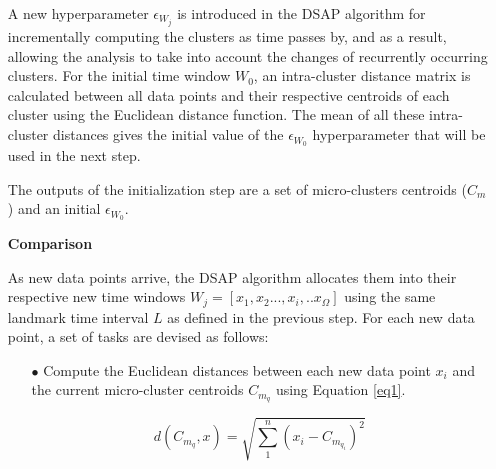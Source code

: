 \begin{itemize}[leftmargin=*]
A new hyperparameter $\epsilon_{W_j}$ is introduced in the DSAP algorithm for incrementally computing the clusters as time passes by, and as a result, allowing the analysis to take into account the changes of recurrently occurring clusters. For the initial time window $W_0$, an intra-cluster distance matrix is calculated between all data points and their respective centroids of each cluster using the Euclidean distance function. The mean of all these intra-cluster distances gives the initial value of the $\epsilon_{W_0}$ hyperparameter that will be used in the next step.

The outputs of the initialization step are a set of micro-clusters centroids ($C_m$) and an initial $\epsilon_{W_0}$.


   
    
    
    
    

    
    
\item[]\textbf{Comparison}

As new data points arrive, the DSAP algorithm allocates them into their respective new time windows $W_j = [x_1,x_2...,x_i,..x_{\Omega}]$ using the same landmark time interval $L$ as defined in the previous step. For each new data point, a set of tasks are devised as follows:

\begin{itemize}
    \item[$\bullet$] Compute the Euclidean distances between each new data point $x_i$ and the current micro-cluster centroids $C_{m_q}$ using Equation \ref{eq1}.
    
    \begin{equation}
    d\left( C_{m_q},x \right)   = \sqrt { \sum_{1}^{n} \left( x_{i} - C_{m_{q_i}}\right)^2} \label{eq1}
    \end{equation}


\end{itemize}
\end{itemize}
